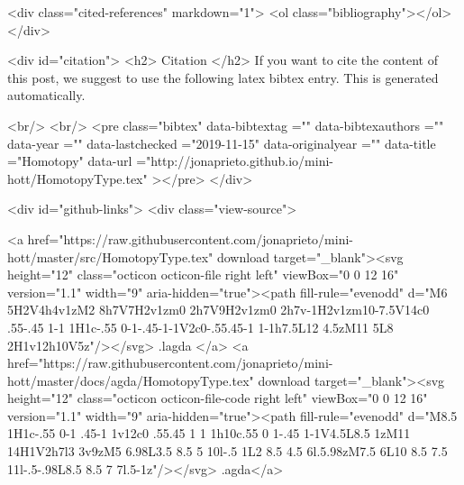{  <div class="cited-references" markdown="1">
  <ol class="bibliography"></ol>
  </div>


  
  <div id="citation">
  <h2> Citation </h2>
  If you want to cite the content of this post,
  we suggest to use the following latex bibtex entry.
  This is generated automatically.

  <br/>
  <br/>
  <pre class="bibtex"
       data-bibtextag =""
       data-bibtexauthors =""
       data-year =""
       data-lastchecked ="2019-11-15"
       data-originalyear =""
       data-title ="Homotopy"
       data-url ="http://jonaprieto.github.io/mini-hott/HomotopyType.tex"
  ></pre>
  </div>
  

  <div id="github-links">
    <div class="view-source">
      
        <a href="https://raw.githubusercontent.com/jonaprieto/mini-hott/master/src/HomotopyType.tex" download target="_blank"><svg height="12" class="octicon octicon-file right left" viewBox="0 0 12 16" version="1.1" width="9" aria-hidden="true"><path fill-rule="evenodd" d="M6 5H2V4h4v1zM2 8h7V7H2v1zm0 2h7V9H2v1zm0 2h7v-1H2v1zm10-7.5V14c0 .55-.45 1-1 1H1c-.55 0-1-.45-1-1V2c0-.55.45-1 1-1h7.5L12 4.5zM11 5L8 2H1v12h10V5z"/></svg> .lagda </a>
        <a href="https://raw.githubusercontent.com/jonaprieto/mini-hott/master/docs/agda/HomotopyType.tex" download target="_blank"><svg height="12" class="octicon octicon-file-code right left" viewBox="0 0 12 16" version="1.1" width="9" aria-hidden="true"><path fill-rule="evenodd" d="M8.5 1H1c-.55 0-1 .45-1 1v12c0 .55.45 1 1 1h10c.55 0 1-.45 1-1V4.5L8.5 1zM11 14H1V2h7l3 3v9zM5 6.98L3.5 8.5 5 10l-.5 1L2 8.5 4.5 6l.5.98zM7.5 6L10 8.5 7.5 11l-.5-.98L8.5 8.5 7 7l.5-1z"/></svg> .agda</a>
      
}
